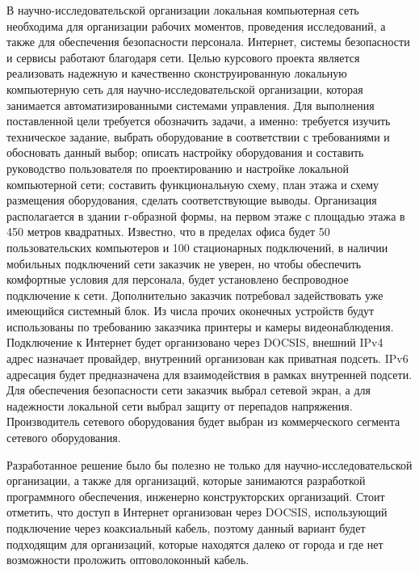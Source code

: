 \label{sec:intro}
\nocite{*}

В научно-исследовательской организации локальная компьютерная сеть необходима для организации рабочих моментов, проведения исследований, 
а также для обеспечения безопасности персонала. Интернет, системы безопасности и сервисы работают благодаря сети. Целью  курсового проекта 
является реализовать надежную и качественно сконструированную локальную компьютерную сеть для научно-исследовательской организации, 
которая занимается автоматизированными системами управления. Для выполнения поставленной цели требуется обозначить задачи, а именно: 
требуется изучить техническое задание, выбрать оборудование в соответствии с требованиями и обосновать данный выбор; описать настройку оборудования 
и составить руководство пользователя по проектированию и настройке локальной компьютерной сети; составить функциональную схему, план этажа и схему размещения 
оборудования, сделать соответствующие  выводы. Организация располагается в здании г-образной формы, на первом этаже с площадью этажа в 450 метров 
квадратных. Известно, что в пределах офиса будет 50 пользовательских компьютеров и 100 стационарных подключений, 
в наличии мобильных подключений сети заказчик не уверен, но чтобы обеспечить комфортные условия для персонала, будет установлено беспроводное подключение к сети. 
Дополнительно заказчик потребовал задействовать уже имеющийся системный блок.
Из числа прочих оконечных устройств будут использованы по требованию заказчика принтеры и камеры видеонаблюдения.
Подключение к Интернет будет организовано через DOCSIS, внешний IPv4 адрес назначает провайдер, внутренний организован как приватная подсеть. 
IPv6 адресация будет предназначена для взаимодействия в рамках внутренней подсети. 
Для обеспечения безопасности сети заказчик выбрал сетевой экран, а для надежности локальной сети выбрал защиту от перепадов напряжения.
Производитель сетевого оборудования будет выбран из коммерческого сегмента сетевого оборудования. 


Разработанное решение было бы полезно не только для научно-исследовательской организации, а также для организаций, 
которые занимаются разработкой программного обеспечения, инженерно конструкторских организаций. Стоит отметить, что доступ в Интернет организован через
DOCSIS, использующий подключение через коаксиальный кабель, поэтому данный вариант будет подходящим для организаций, которые находятся далеко от города и 
где нет возможности проложить оптоволоконный кабель.
